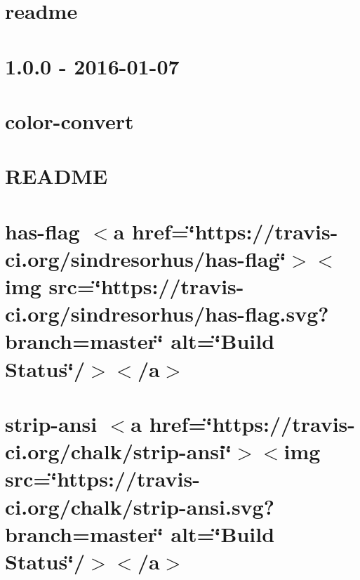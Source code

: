 \let\mypdfximage\pdfximage\def\pdfximage{\immediate\mypdfximage}\documentclass[twoside]{book}
\newcommand{\+}{\discretionary{\mbox{\scriptsize$\hookleftarrow$}}{}{}}
\begin{document}
\chapter{readme}
\label{md_heap-visualizer_node_modules_inquirer_node_modules_chalk_readme}

\chapter{1.0.0 -\/ 2016-\/01-\/07}
\label{md_heap-visualizer_node_modules_inquirer_node_modules_color-convert__c_h_a_n_g_e_l_o_g}

\chapter{color-\/convert}
\label{md_heap-visualizer_node_modules_inquirer_node_modules_color-convert__r_e_a_d_m_e}

\chapter{R\+E\+A\+D\+ME}
\label{md_heap-visualizer_node_modules_inquirer_node_modules_color-name__r_e_a_d_m_e}

\chapter{has-\/flag $<$a href=\char`\"{}https\+://travis-\/ci.\+org/sindresorhus/has-\/flag\char`\"{}$>$$<$img src=\char`\"{}https\+://travis-\/ci.\+org/sindresorhus/has-\/flag.\+svg?branch=master\char`\"{} alt=\char`\"{}\+Build Status\char`\"{}/$>$$<$/a$>$}
\label{md_heap-visualizer_node_modules_inquirer_node_modules_has-flag_readme}

\chapter{strip-\/ansi $<$a href=\char`\"{}https\+://travis-\/ci.\+org/chalk/strip-\/ansi\char`\"{}$>$$<$img src=\char`\"{}https\+://travis-\/ci.\+org/chalk/strip-\/ansi.\+svg?branch=master\char`\"{} alt=\char`\"{}\+Build Status\char`\"{}/$>$$<$/a$>$}
\label{md_heap-visualizer_node_modules_inquirer_node_modules_strip-ansi_readme}

\end{document}
